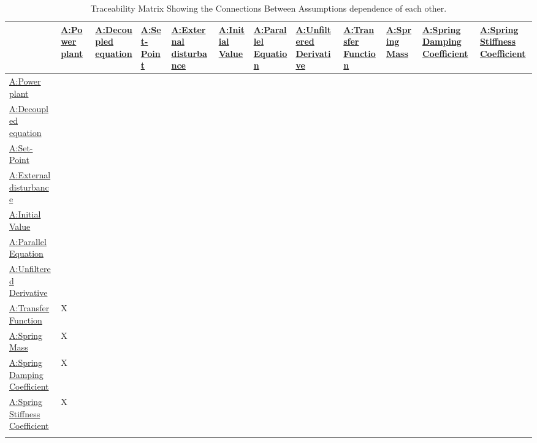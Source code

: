 \documentclass[12pt]{article}
\begin{document}
\begin{longtable}{l l l l l l l l l l l l}
\toprule
\textbf{} & \textbf{\hyperref[pwrPlant]{A:Power plant}} & \textbf{\hyperref[decoupled]{A:Decoupled equation}} & \textbf{\hyperref[setPoint]{A:Set-Point}} & \textbf{\hyperref[externalDisturb]{A:External disturbance}} & \textbf{\hyperref[initialValue]{A:Initial Value}} & \textbf{\hyperref[parallelEq]{A:Parallel Equation}} & \textbf{\hyperref[unfilteredDerivative]{A:Unfiltered Derivative}} & \textbf{\hyperref[pwrPlantTxFnx]{A:Transfer Function}} & \textbf{\hyperref[massSpring]{A:Spring Mass}} & \textbf{\hyperref[dampingCoeffSpring]{A:Spring Damping Coefficient}} & \textbf{\hyperref[stiffnessCoeffSpring]{A:Spring Stiffness Coefficient}}
\\
\midrule
\endhead
\hyperref[pwrPlant]{A:Power plant} &  &  &  &  &  &  &  &  &  &  & 
\\
\hyperref[decoupled]{A:Decoupled equation} &  &  &  &  &  &  &  &  &  &  & 
\\
\hyperref[setPoint]{A:Set-Point} &  &  &  &  &  &  &  &  &  &  & 
\\
\hyperref[externalDisturb]{A:External disturbance} &  &  &  &  &  &  &  &  &  &  & 
\\
\hyperref[initialValue]{A:Initial Value} &  &  &  &  &  &  &  &  &  &  & 
\\
\hyperref[parallelEq]{A:Parallel Equation} &  &  &  &  &  &  &  &  &  &  & 
\\
\hyperref[unfilteredDerivative]{A:Unfiltered Derivative} &  &  &  &  &  &  &  &  &  &  & 
\\
\hyperref[pwrPlantTxFnx]{A:Transfer Function} & X &  &  &  &  &  &  &  &  &  & 
\\
\hyperref[massSpring]{A:Spring Mass} & X &  &  &  &  &  &  &  &  &  & 
\\
\hyperref[dampingCoeffSpring]{A:Spring Damping Coefficient} & X &  &  &  &  &  &  &  &  &  & 
\\
\hyperref[stiffnessCoeffSpring]{A:Spring Stiffness Coefficient} & X &  &  &  &  &  &  &  &  &  & 
\\
\bottomrule
\caption{Traceability Matrix Showing the Connections Between Assumptions dependence of each other.}
\label{Table:TraceMatAvsA}
\end{longtable}
\end{document}
